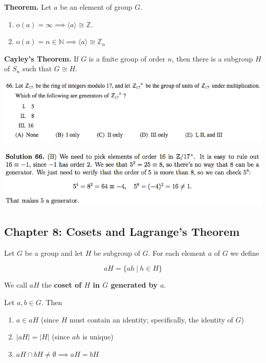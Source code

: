 \documentclass{article}
\begin{document}
\textbf{Theorem.} Let \(a\) be an element of group \(G\). 

\begin{enumerate}[1.]

\item \(\text{o}(a) = \infty \implies \langle a \rangle \cong \mathbb{Z}\).

\item \(\text{o}(a) = n \in \mathbb{N} \implies \langle a \rangle \cong \mathbb{Z}_n\)

\end{enumerate}



\textbf{Cayley's Theorem.} If \(G\) is a finite group of order \(n\), then there is a subgroup \(H\) of \(S_n\) such that \(G \cong H\).

\includegraphics[scale=0.65]{1268_66}

\includegraphics[scale=0.65]{1268_66s}

\pagebreak
\subsection{Chapter 8: Cosets and Lagrange's Theorem}

Let \(G\) be a group and let \(H\) be subgroup of \(G\). For each element \(a\) of \(G\) we define

\[
aH = \{ ah \ | \ h \in H\}
\]

We call \(aH\) the \textbf{coset of \(H\) in \(G\) generated by \(a\)}.

Let \(a, b \in G\). Then

\begin{enumerate}[1.]

\item \(a \in aH\) (since \(H\) must contain an identity; specifically, the identity of \(G\))

\item \(|aH| = |H|\) (since \(ah\) is unique)

\item \(aH \cap bH \neq  \emptyset \implies aH = bH\)

\end{enumerate}
\end{document}
